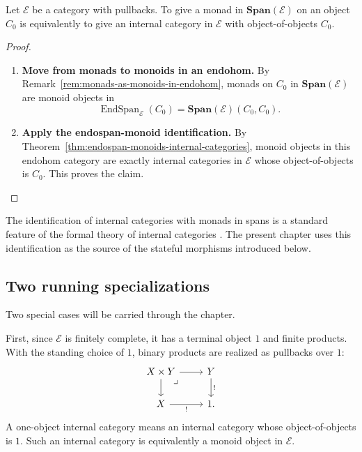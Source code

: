 \begin{corollary}
\label{cor:monads-in-spans-internal-categories}
    Let \(\mathcal E\) be a category with pullbacks. To give a monad in \(\mathbf{Span}(\mathcal E)\) on an object \(C_0\) is equivalently to give an internal category in \(\mathcal E\) with object-of-objects \(C_0\).
\end{corollary}
\begin{proof}
    \leavevmode
    \begin{enumerate}
        \item \textbf{Move from monads to monoids in an endohom.} By Remark~\ref{rem:monads-as-monoids-in-endohom}, monads on \(C_0\) in \(\mathbf{Span}(\mathcal E)\) are monoid objects in
        \[
            \operatorname{EndSpan}_{\mathcal E}(C_0)
            =
            \mathbf{Span}(\mathcal E)(C_0,C_0).
        \]

        \item \textbf{Apply the endospan-monoid identification.} By Theorem~\ref{thm:endospan-monoids-internal-categories}, monoid objects in this endohom category are exactly internal categories in \(\mathcal E\) whose object-of-objects is \(C_0\). This proves the claim.
    \end{enumerate}
\end{proof}

\begin{remark}
\label{rem:internal-categories-monads-literature}
    The identification of internal categories with monads in spans is a standard feature of the formal theory of internal categories \cite{StreetFormalTheoryOfMonads,LackCompanion,MirandaInternalCategories}. The present chapter uses this identification as the source of the stateful morphisms introduced below.
\end{remark}

\subsection{Two running specializations}
\label{subsec:two-running-specializations}

Two special cases will be carried through the chapter.

First, since \(\mathcal E\) is finitely complete, it has a terminal object \(1\) and finite products. With the standing choice of \(1\), binary products are realized as pullbacks over \(1\):
\[
    \begin{tikzcd}
            X\times Y
                \arrow[r]
                \arrow[d]
                \arrow[dr, phantom, "\lrcorner", very near start]
        &
            Y 
                \arrow[d, "!"]
        \\
            X 
                \arrow[r, "!"']
        &
            1.
    \end{tikzcd}
\]
A one-object internal category means an internal category whose object-of-objects is \(1\). Such an internal category is equivalently a monoid object in \(\mathcal E\).

